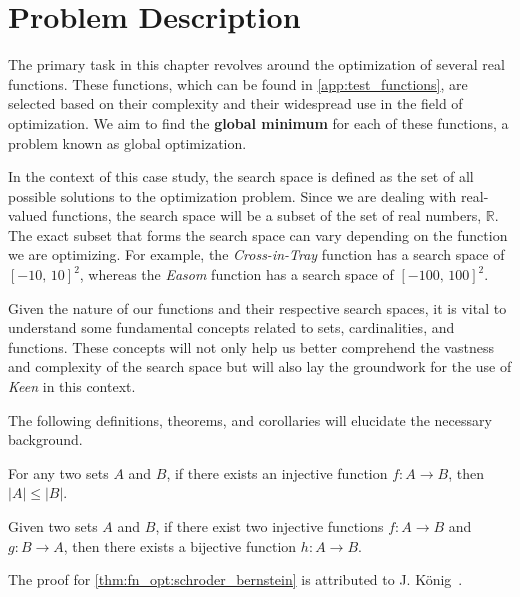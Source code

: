 \section{Problem Description}
\label{sec:fn_opt:problem}
  The primary task in this chapter revolves around the optimization of
  several real functions.
  These functions, which can be found in \vref{app:test_functions}, are
  selected based on their complexity and their widespread use in the field of
  optimization.
  We aim to find the \textbf{global minimum} for each of these functions, a
  problem known as global optimization.

  In the context of this case study, the search space is defined as the set of
  all possible solutions to the optimization problem.
  Since we are dealing with real-valued functions, the search space will be a
  subset of the set of real numbers, \(\mathbb{R}\).
  The exact subset that forms the search space can vary depending on the
  function we are optimizing.
  For example, the \textit{Cross-in-Tray} function has a search space of
  \([-10,\,10]^2\), whereas the \textit{Easom} function has a search space of
  \([-100,\,100]^2\).
  
  Given the nature of our functions and their respective search spaces, it is
  vital to understand some fundamental concepts related to sets,
  cardinalities, and functions.
  These concepts will not only help us better comprehend the vastness and
  complexity of the search space but will also lay the groundwork for the use
  of \textit{Keen} in this context.
  
  The following definitions, theorems, and corollaries will elucidate the
  necessary background.

  \begin{definition}
  \label{def:fn_opt:cardinality_inequality}
    For any two sets \(A\) and \(B\), if there exists an injective function
    \(f : A \to B\), then \(|A| \leq |B|\).
  \end{definition}

  \begin{theorem}
  \label{thm:fn_opt:schroder_bernstein}
    Given two sets \(A\) and \(B\), if there exist two injective functions
    \(f : A \to B\) and \(g : B \to A\), then there exists a bijective
    function \(h : A \to B\).
  \end{theorem}

  The proof for \vref{thm:fn_opt:schroder_bernstein} is attributed to J.
  König~\autocite{konigTheorieEnsembles1906}.

